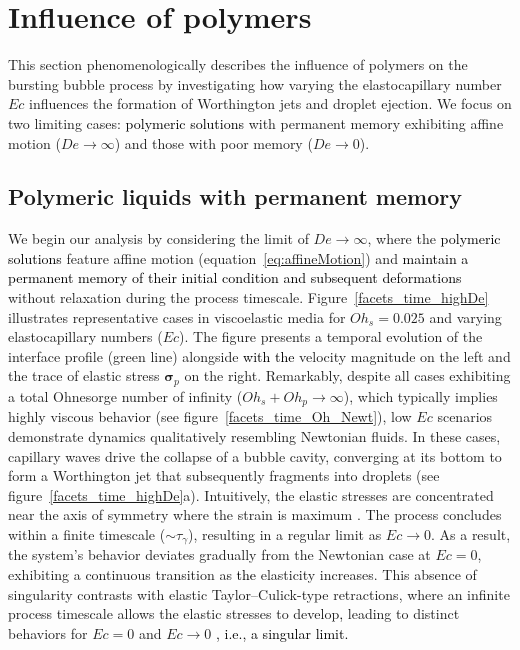 \documentclass{jfm}
\newcommand{\DL}[1]{{\textcolor{black}{#1}}}
\newcommand{\VS}[1]{{\textcolor{black}{#1}}}
\begin{document}
\section{Influence of polymers}
\label{sec:polymers}

This section phenomenologically describes the influence of polymers on the bursting bubble process by investigating how varying the elastocapillary number $Ec$ influences the formation of Worthington jets and droplet ejection. We focus on two limiting cases: \DL{polymeric solutions} with permanent memory exhibiting affine motion ($De \to \infty$) and those with poor memory ($De \to 0$).

\subsection{Polymeric liquids with permanent memory}
\label{sec:LargeDe}

We begin our analysis by considering the limit of $De \to \infty$, where the \DL{polymeric solutions} feature affine motion (equation~\eqref{eq:affineMotion}) and \VS{maintain a permanent memory of their initial condition and subsequent deformations} without relaxation during the process timescale.
Figure~\ref{facets_time_highDe} illustrates representative cases in viscoelastic media for $Oh_s = 0.025$ and varying elastocapillary numbers ($Ec$). The figure presents a temporal evolution of the interface profile (green line) alongside \DL{with the} velocity magnitude on the left and the trace of elastic stress $\boldsymbol{\sigma}_p$ on the right.
Remarkably, despite all cases exhibiting a total Ohnesorge number of infinity ($Oh_s + Oh_p \to \infty$), which typically implies highly viscous behavior (see figure~\ref{facets_time_Oh_Newt}), low $Ec$ scenarios demonstrate dynamics qualitatively resembling Newtonian fluids. In these cases, capillary waves drive the collapse of a bubble cavity, converging at its bottom to form a Worthington jet that subsequently fragments into droplets (see figure~\ref{facets_time_highDe}a). Intuitively, the elastic stresses are concentrated near the axis of symmetry where the strain is maximum \citep{turkoz2018axisymmetric,eggers2020self}.
The process concludes within a finite timescale ($\sim \tau_\gamma$), resulting in a regular limit as $Ec \to 0$. As a result, the system's behavior deviates gradually from the Newtonian case at $Ec = 0$, exhibiting a continuous transition as \DL{the} elasticity increases.
This absence of singularity contrasts with elastic Taylor--Culick-type retractions, where an infinite process timescale allows the elastic stresses to develop\DL{,} leading to distinct behaviors for $Ec = 0$ and $Ec \to 0$ \citep{BertinSanjay2024}\DL{, i.e., a singular limit.}
\end{document}
